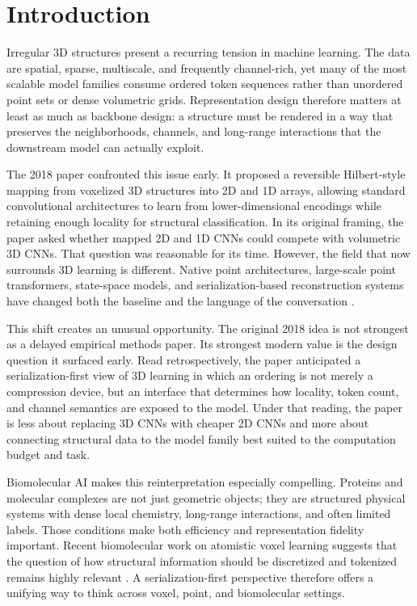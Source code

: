 \section{Introduction}

Irregular 3D structures present a recurring tension in machine learning. The data are spatial, sparse, multiscale, and frequently channel-rich, yet many of the most scalable model families consume ordered token sequences rather than unordered point sets or dense volumetric grids. Representation design therefore matters at least as much as backbone design: a structure must be rendered in a way that preserves the neighborhoods, channels, and long-range interactions that the downstream model can actually exploit.

The 2018 paper \citet{corcoran2018spatial} confronted this issue early. It proposed a reversible Hilbert-style mapping from voxelized 3D structures into 2D and 1D arrays, allowing standard convolutional architectures to learn from lower-dimensional encodings while retaining enough locality for structural classification. In its original framing, the paper asked whether mapped 2D and 1D CNNs could compete with volumetric 3D CNNs. That question was reasonable for its time. However, the field that now surrounds 3D learning is different. Native point architectures, large-scale point transformers, state-space models, and serialization-based reconstruction systems have changed both the baseline and the language of the conversation \citep{zhao2021pointtransformer, wu2024ptv3, liang2024pointmamba, zhang2024voxelmamba, li2025noksr}.

This shift creates an unusual opportunity. The original 2018 idea is not strongest as a delayed empirical methods paper. Its strongest modern value is the design question it surfaced early. Read retrospectively, the paper anticipated a serialization-first view of 3D learning in which an ordering is not merely a compression device, but an interface that determines how locality, token count, and channel semantics are exposed to the model. Under that reading, the paper is less about replacing 3D CNNs with cheaper 2D CNNs and more about connecting structural data to the model family best suited to the computation budget and task.

Biomolecular AI makes this reinterpretation especially compelling. Proteins and molecular complexes are not just geometric objects; they are structured physical systems with dense local chemistry, long-range interactions, and often limited labels. Those conditions make both efficiency and representation fidelity important. Recent biomolecular work on atomistic voxel learning suggests that the question of how structural information should be discretized and tokenized remains highly relevant \citep{park2025atomae}. A serialization-first perspective therefore offers a unifying way to think across voxel, point, and biomolecular settings.

